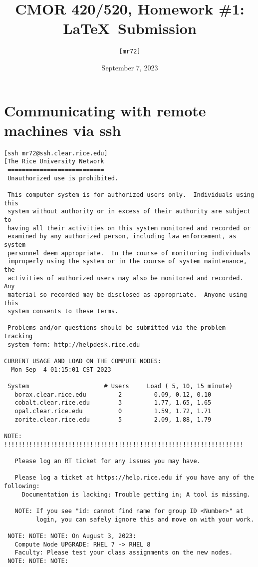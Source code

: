 \documentclass{article}
\title{CMOR 420/520, Homework \#1: LaTeX\ Submission}
\author{\texttt{[mr72]}}
\date{September 7, 2023}
\begin{document}
\maketitle

\section{Communicating with remote machines via ssh}
\begin{verbatim}
[ssh mr72@ssh.clear.rice.edu]
[The Rice University Network
 ===========================
 Unauthorized use is prohibited.
 
 This computer system is for authorized users only.  Individuals using this
 system without authority or in excess of their authority are subject to
 having all their activities on this system monitored and recorded or
 examined by any authorized person, including law enforcement, as system
 personnel deem appropriate.  In the course of monitoring individuals
 improperly using the system or in the course of system maintenance, the
 activities of authorized users may also be monitored and recorded.  Any
 material so recorded may be disclosed as appropriate.  Anyone using this
 system consents to these terms.
 
 Problems and/or questions should be submitted via the problem tracking
 system form: http://helpdesk.rice.edu
 
CURRENT USAGE AND LOAD ON THE COMPUTE NODES:
  Mon Sep  4 01:15:01 CST 2023

 System                   	# Users   	Load ( 5, 10, 15 minute)      
   borax.clear.rice.edu   	    2     	  0.09, 0.12, 0.10            
   cobalt.clear.rice.edu  	    3     	  1.77, 1.65, 1.65            
   opal.clear.rice.edu    	    0     	  1.59, 1.72, 1.71            
   zorite.clear.rice.edu  	    5     	  2.09, 1.88, 1.79            

NOTE: !!!!!!!!!!!!!!!!!!!!!!!!!!!!!!!!!!!!!!!!!!!!!!!!!!!!!!!!!!!!!!!!!!!
 
   Please log an RT ticket for any issues you may have.
 
   Please log a ticket at https://help.rice.edu if you have any of the following:
     Documentation is lacking; Trouble getting in; A tool is missing.
 
   NOTE: If you see "id: cannot find name for group ID <Number>" at 
         login, you can safely ignore this and move on with your work.
 
 NOTE: NOTE: NOTE: On August 3, 2023:
   Compute Node UPGRADE: RHEL 7 -> RHEL 8
   Faculty: Please test your class assignments on the new nodes.
 NOTE: NOTE: NOTE:
 

\end{verbatim}
\end{document}
